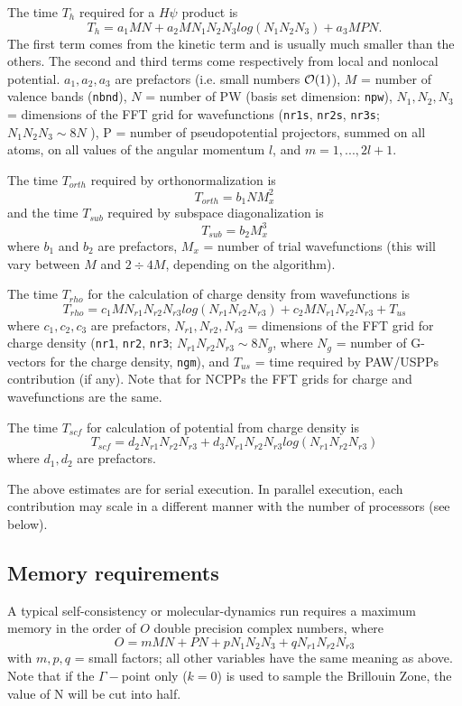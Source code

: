 \documentclass[12pt,a4paper]{article}
\begin{document}
The time $T_h$ required for a $H\psi$ product is
$$T_h = a_1 M N + a_2 M N_1 N_2 N_3 log(N_1 N_2 N_3 ) + a_3 M P N. $$
The first term comes from the kinetic term and is usually much smaller
than the others. The second and third terms come respectively from local
and nonlocal potential. $a_1, a_2, a_3$ are prefactors (i.e.
small numbers ${\cal O}(1)$), $M$ = number of valence
bands (\texttt{nbnd}), $N$ = number of PW (basis set dimension: \texttt{npw}), $N_1, N_2, N_3$ =
dimensions of the FFT grid for wavefunctions (\texttt{nr1s}, \texttt{nr2s},
\texttt{nr3s}; $N_1 N_2 N_3 \sim 8N$ ), 
P = number of pseudopotential projectors, summed on all atoms, on all values of the
angular momentum $l$, and $m = 1, . . . , 2l + 1$.

The time $T_{orth}$ required by orthonormalization is
$$T_{orth} = b_1 N M_x^2$$ 
and the time $T_{sub}$ required by subspace diagonalization is
$$T_{sub} = b_2 M_x^3$$
where $b_1$ and $b_2$ are prefactors, $M_x$ = number of trial wavefunctions 
(this will vary between $M$ and $2\div4 M$, depending on the algorithm).
    
The time $T_{rho}$ for the calculation of charge density from wavefunctions is
$$T_{rho} = c_1 M N_{r1} N_{r2}N_{r3} log(N_{r1} N_{r2} N_{r3}) + 
            c_2 M N_{r1} N_{r2} N_{r3} + T_{us}$$
where $c_1, c_2, c_3$ are prefactors, $N_{r1}, N_{r2}, N_{r3}$ =
dimensions of the FFT grid for charge density (\texttt{nr1},
\texttt{nr2}, \texttt{nr3}; $N_{r1} N_{r2} N_{r3} \sim 8N_g$,
where $N_g$ = number of G-vectors for the charge density,
\texttt{ngm}), and 
$T_{us}$ = time required by PAW/USPPs contribution (if any).
Note that for NCPPs the FFT grids for charge and
wavefunctions are the same.
 
The time $T_{scf}$ for calculation of potential from charge density is
$$T_{scf} = d_2 N_{r1} N_{r2} N_{r3} + d_3 N_{r1} N_{r2} N_{r3} 
            log(N_{r1} N_{r2} N_{r3} )$$
where $d_1, d_2$ are prefactors.

The above estimates are for serial execution. In parallel execution,
each contribution may scale in a different manner with the number of processors (see below).

\subsection{Memory requirements}

A typical self-consistency or molecular-dynamics run requires a maximum
memory in the order of $O$ double precision complex numbers, where
$$ O = m M N + P N + p N_1 N_2 N_3 + q N_{r1} N_{r2} N_{r3}$$
with $m, p, q$ = small factors; all other variables have the same meaning as
above. Note that if the $\Gamma-$point only ($k=0$) is used to sample the 
Brillouin Zone, the value of N will be cut into half.
\end{document}
